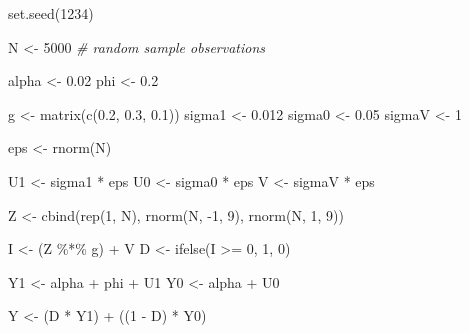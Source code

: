 \documentclass[9pt,twocolumn,twoside,]{pnas-new}
\newenvironment{Shaded}{}{}
\newcommand{\CommentTok}[1]{\textcolor[rgb]{0.38,0.63,0.69}{\textit{#1}}}
\newcommand{\DecValTok}[1]{\textcolor[rgb]{0.25,0.63,0.44}{#1}}
\newcommand{\FloatTok}[1]{\textcolor[rgb]{0.25,0.63,0.44}{#1}}
\newcommand{\FunctionTok}[1]{\textcolor[rgb]{0.02,0.16,0.49}{#1}}
\newcommand{\NormalTok}[1]{#1}
\newcommand{\OtherTok}[1]{\textcolor[rgb]{0.00,0.44,0.13}{#1}}
\newcommand{\SpecialCharTok}[1]{\textcolor[rgb]{0.25,0.44,0.63}{#1}}
\begin{document}
\begin{Shaded}
\begin{Highlighting}[]
\FunctionTok{set.seed}\NormalTok{(}\DecValTok{1234}\NormalTok{)}

\NormalTok{N }\OtherTok{\textless{}{-}} \DecValTok{5000} \CommentTok{\# random sample observations}

\NormalTok{alpha }\OtherTok{\textless{}{-}} \FloatTok{0.02}
\NormalTok{phi }\OtherTok{\textless{}{-}} \FloatTok{0.2}

\NormalTok{g }\OtherTok{\textless{}{-}} \FunctionTok{matrix}\NormalTok{(}\FunctionTok{c}\NormalTok{(}\FloatTok{0.2}\NormalTok{, }\FloatTok{0.3}\NormalTok{, }\FloatTok{0.1}\NormalTok{))}
\NormalTok{sigma1 }\OtherTok{\textless{}{-}} \FloatTok{0.012}
\NormalTok{sigma0 }\OtherTok{\textless{}{-}} \FloatTok{0.05}
\NormalTok{sigmaV }\OtherTok{\textless{}{-}} \DecValTok{1}

\NormalTok{eps }\OtherTok{\textless{}{-}} \FunctionTok{rnorm}\NormalTok{(N)}

\NormalTok{U1 }\OtherTok{\textless{}{-}}\NormalTok{ sigma1 }\SpecialCharTok{*}\NormalTok{ eps}
\NormalTok{U0 }\OtherTok{\textless{}{-}}\NormalTok{ sigma0 }\SpecialCharTok{*}\NormalTok{ eps}
\NormalTok{V }\OtherTok{\textless{}{-}}\NormalTok{ sigmaV }\SpecialCharTok{*}\NormalTok{ eps}

\NormalTok{Z }\OtherTok{\textless{}{-}} \FunctionTok{cbind}\NormalTok{(}\FunctionTok{rep}\NormalTok{(}\DecValTok{1}\NormalTok{, N),}
           \FunctionTok{rnorm}\NormalTok{(N, }\SpecialCharTok{{-}}\DecValTok{1}\NormalTok{, }\DecValTok{9}\NormalTok{),}
           \FunctionTok{rnorm}\NormalTok{(N, }\DecValTok{1}\NormalTok{, }\DecValTok{9}\NormalTok{))}

\NormalTok{I }\OtherTok{\textless{}{-}}\NormalTok{ (Z }\SpecialCharTok{\%*\%}\NormalTok{ g) }\SpecialCharTok{+}\NormalTok{ V}
\NormalTok{D }\OtherTok{\textless{}{-}} \FunctionTok{ifelse}\NormalTok{(I }\SpecialCharTok{\textgreater{}=} \DecValTok{0}\NormalTok{, }\DecValTok{1}\NormalTok{, }\DecValTok{0}\NormalTok{)}

\NormalTok{Y1 }\OtherTok{\textless{}{-}}\NormalTok{ alpha }\SpecialCharTok{+}\NormalTok{ phi }\SpecialCharTok{+}\NormalTok{ U1}
\NormalTok{Y0 }\OtherTok{\textless{}{-}}\NormalTok{ alpha }\SpecialCharTok{+}\NormalTok{ U0}

\NormalTok{Y }\OtherTok{\textless{}{-}}\NormalTok{ (D }\SpecialCharTok{*}\NormalTok{ Y1) }\SpecialCharTok{+}\NormalTok{ ((}\DecValTok{1} \SpecialCharTok{{-}}\NormalTok{ D) }\SpecialCharTok{*}\NormalTok{ Y0)}


\end{Highlighting}
\end{Shaded}
\end{document}
